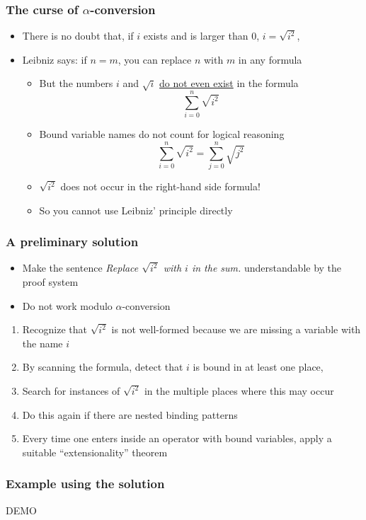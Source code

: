 \documentclass[compress]{beamer}
\begin{document}
\begin{frame}
\frametitle{The curse of \(\alpha\)-conversion}
\begin{itemize}
\item There is no doubt that, if \(i\) exists and is larger than 0,
\(i = \sqrt{i^2}\),
\item Leibniz says: if \(n = m\), you can replace \(n\) with \(m\) in
any formula
\begin{itemize}
\item But the numbers \(i\) and \(\sqrt{i}\) \underline{do not even exist}
in the formula
\[\sum_{i = 0}^{n} \sqrt{i^2}\]
\item Bound variable names do not count for logical reasoning
 \[\sum_{i = 0}^{n} {\sqrt{i^2}} = 
\sum_{j = 0}^{n} {\sqrt{j^2}}\]
\item \(\sqrt{i ^ 2}\) does not occur in the right-hand side formula!
\item So you cannot use Leibniz' principle directly
\end{itemize}
\end{itemize}
\end{frame}
\begin{frame}
\frametitle{A preliminary solution}
\begin{itemize}
\item Make the sentence {\em Replace \(\sqrt{i^2}\) with \(i\) in the sum.}
understandable by the proof system
\item Do not work modulo \(\alpha\)-conversion
\end{itemize}
\begin{enumerate}
\item Recognize that \(\sqrt{i^2}\) is not well-formed because we are missing
a variable with the name \(i\)
\item By scanning the formula, detect that \(i\) is bound in at least one place,
\item Search for instances of \(\sqrt{i^2}\) in the multiple places where
this may occur
\item Do this again if there are nested binding patterns
\item Every time one enters inside an operator with bound variables, apply
a suitable ``extensionality'' theorem
\end{enumerate}
\end{frame}
\begin{frame}
\frametitle{Example using the solution}

\begin{center}
\Huge DEMO
\end{center}
\end{frame}
\end{document}
